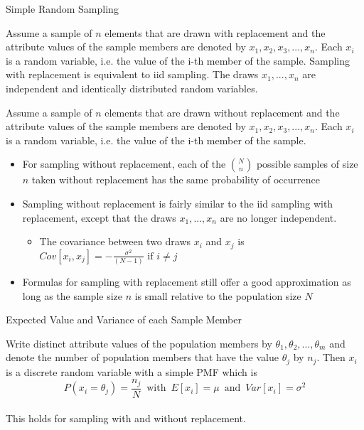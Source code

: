 \documentclass{beamer}
\numberwithin{equation}{section}
\begin{document}
\begin{frame}{Simple Random Sampling}
\scriptsize

\begin{definition}
Assume a sample of $n$ elements that are drawn with replacement and the attribute values of the sample members are denoted by $x_1,x_2,x_3,...,x_n$. Each $x_i$ is a random variable, i.e. the value of the i-th member of the sample. Sampling with replacement is equivalent to iid sampling. The draws $x_1,...,x_n$ are independent and identically distributed random variables. 

\end{definition}

\begin{definition}
Assume a sample of $n$ elements that are drawn without replacement and the attribute values of the sample members are denoted by $x_1,x_2,x_3,...,x_n$. Each $x_i$ is a random variable, i.e. the value of the i-th member of the sample. 


\end{definition}

\begin{itemize}
\item For sampling without replacement, each of the ${N \choose n}$ possible samples of size $n$ taken without replacement has the same probability of occurrence
\item Sampling without replacement is fairly similar to the iid sampling with replacement, except that the draws $x_1,...,x_n$ are no longer independent.
\begin{itemize}
\item \scriptsize The covariance between two draws $x_i$ and $x_j$ is  $Cov[x_i,x_j]=-\frac{\sigma^2}{(N-1)} \mbox{ if }  i\neq j$
\end{itemize}
\item Formulas for sampling with replacement still offer a good approximation as long as the sample size $n$ is small relative to the population size $N$
\end{itemize}

\end{frame}

\begin{frame}{Expected Value and Variance of each Sample Member}
\scriptsize

\begin{lemma}
Write distinct attribute values of the population members by $\theta_1,\theta_2,...,\theta_m$ and denote the number of population members that have the value $\theta_j$ by $n_j$. Then $x_i$ is a discrete random variable with a simple PMF which is
$$
P(x_i=\theta_j)=\frac{n_j}{N}\,\,\, \mbox{with} \,\,\, E[x_i]=\mu \,\,\, \mbox{and} \,\,\, Var[x_i]=\sigma^2
$$\\
This holds for sampling with and without replacement.
\end{lemma}

\end{frame}
\end{document}

